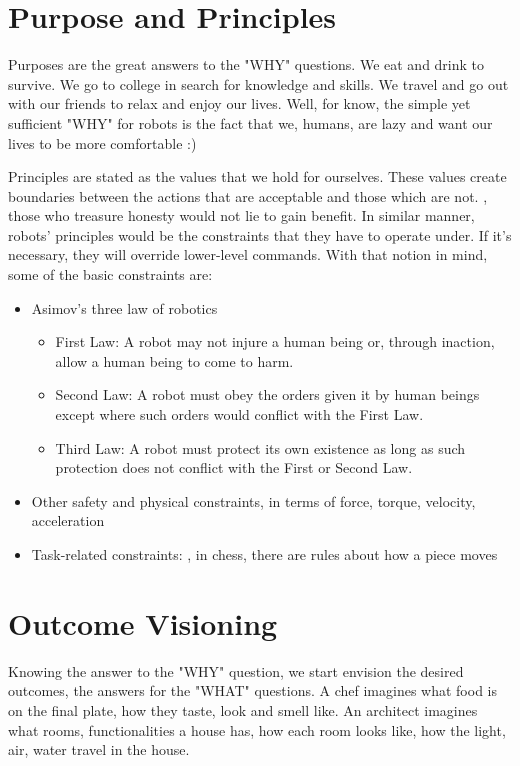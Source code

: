 \section{Purpose and Principles}
Purposes are the great answers to the "WHY" questions. We eat and drink to survive. We go to college in search for knowledge and skills. We travel and go out with our friends to relax and enjoy our lives. Well, for know, the simple yet sufficient "WHY" for robots is the fact that we, humans, are lazy and want our lives to be more comfortable :)

Principles are stated as the values that we hold for ourselves. These values create boundaries between the actions that are acceptable and those which are not. \Eg, those who treasure honesty would not lie to gain benefit. In similar manner, robots' principles would be the constraints that they have to operate under. If it's necessary, they will override lower-level commands. With that notion in mind, some of the basic constraints are:
\begin{itemize}
	\item Asimov's three law of robotics \cite{asimov2004robot}
	\begin{itemize}
		\item First Law: A robot may not injure a human being or, through inaction, allow a human being to come to harm.
		\item Second Law: A robot must obey the orders given it by human beings except where such orders would conflict with the First Law.
		\item Third Law: A robot must protect its own existence as long as such protection does not conflict with the First or Second Law.
	\end{itemize}
	\item Other safety and physical constraints, in terms of force, torque, velocity, acceleration
	\item Task-related constraints: \eg, in chess, there are rules about how a piece moves
\end{itemize}

\section{Outcome Visioning}
Knowing the answer to the "WHY" question, we start envision the desired outcomes, the answers for the "WHAT" questions. A chef imagines what food is on the final plate, how they taste, look and smell like. An architect imagines what rooms, functionalities a house has, how each room looks like, how the light, air, water travel in the house.

